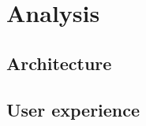 
\chapter{Analysis} %

\label{ch:architecture} %


\section{Architecture}


\section{User experience}